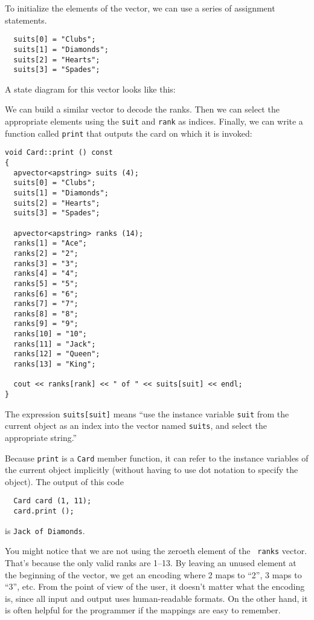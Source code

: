 To initialize the elements of the vector, we can use a series of
assignment statements.

\begin{verbatim}
  suits[0] = "Clubs";
  suits[1] = "Diamonds";
  suits[2] = "Hearts";
  suits[3] = "Spades";
\end{verbatim}
%
A state diagram for this vector looks like this:


\vspace{0.1in}
\centerline{}
\vspace{0.1in}

We can build a similar vector to decode the ranks.
Then we can select the appropriate elements
using the {\tt suit} and {\tt rank} as indices.  Finally, we can
write a function called {\tt print} that outputs the card on which
it is invoked:

\begin{verbatim}
void Card::print () const
{
  apvector<apstring> suits (4);
  suits[0] = "Clubs";
  suits[1] = "Diamonds";
  suits[2] = "Hearts";
  suits[3] = "Spades";

  apvector<apstring> ranks (14);
  ranks[1] = "Ace";
  ranks[2] = "2";
  ranks[3] = "3";
  ranks[4] = "4";
  ranks[5] = "5";
  ranks[6] = "6";
  ranks[7] = "7";
  ranks[8] = "8";
  ranks[9] = "9";
  ranks[10] = "10";
  ranks[11] = "Jack";
  ranks[12] = "Queen";
  ranks[13] = "King";

  cout << ranks[rank] << " of " << suits[suit] << endl;
}
\end{verbatim}
%
The expression {\tt suits[suit]} means ``use the instance variable
{\tt suit} from the current object as an index into the vector named
{\tt suits}, and select the appropriate string.''

Because {\tt print} is a {\tt Card} member function,
it can refer to the instance variables of the current object
implicitly (without having to use dot notation to specify the
object).  The output of this code

\begin{verbatim}
  Card card (1, 11);
  card.print ();
\end{verbatim}
%
is {\tt Jack of Diamonds}.

You might notice that we are not using the zeroeth element of the {\tt
ranks} vector.  That's because the only valid ranks are 1--13.  By
leaving an unused element at the beginning of the vector, we get an
encoding where 2 maps to ``2'', 3 maps to ``3'', etc.  From the point
of view of the user, it doesn't matter what the encoding is, since all
input and output uses human-readable formats.  On the other hand, it
is often helpful for the programmer if the mappings are easy
to remember.

